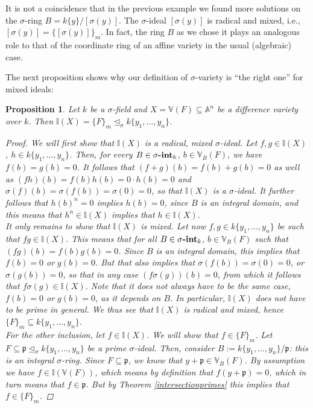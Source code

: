 \documentclass{article}
\def\I{\mathbb{I}}
\def\VV{\mathbb{V}}
\def\p{\mathfrak{p}}
\def\s{\sigma}
\def\si{\unlhd_{\sigma}}
\newcommand{\catname}[1]{{\normalfont\textbf{#1}}}
\newcommand{\sintk}{\s\text{\catname{-int}}_k}
\newenvironment{bew}{\begin{proof}[Proof]}{\end{proof}}
\theoremstyle{plain}
\newtheorem{prop}[Satz]{Proposition}
\theoremstyle{definition}
\begin{document}
It is not a coincidence that in the previous example we found more solutions on the $\s$-ring $B = k\{y\}/[\s(y)]$. The $\s$-ideal $[\s(y)]$ is radical and mixed, i.e., $[\s(y)] = \{ [\s(y)] \}_m$.
In fact, the ring $B$ as we chose it plays an analogous role to that of the coordinate ring of an affine variety in the usual (algebraic) case.

The next proposition shows why our definition of $\s$-variety is ``the right one'' for mixed ideals:

\begin{prop}\label{I=F_m}
Let $k$ be a $\s$-field and $X = \VV(F) \subseteq \mathbb{A}^n$ be a difference variety over $k$. Then $\I(X) = \{F\}_m \si k\{y_1,\ldots,y_n\}$. 
\begin{bew}
We will first show that $\I(X)$ is a radical, mixed $\s$-ideal.
Let $f, g \in \I(X)$, $h \in k\{y_1,\ldots,y_n\}$. Then, for every $B \in \sintk$, $b \in \VV_B(F)$, we have $f(b) = g(b) = 0$.
It follows that $(f + g)(b) = f(b) + g(b) = 0$ as well as $(fh)(b) = f(b)h(b) = 0 \cdot h(b) = 0$ and $\s(f)(b) = \s(f(b)) = \s(0) = 0$, so that $\I(X)$ is a $\s$-ideal.
It further follows that $h(b)^n = 0$ implies $h(b) = 0$, since $B$ is an integral domain, and this means that $h^n \in \I(X)$ implies that $ h \in \I(X)$. \\
\indent It only remains to show that $\I(X)$ is mixed. Let now $f,g \in k\{y_1,\ldots,y_n\}$ be such that $fg \in \I(X)$. This means that for all  $B \in \sintk$, $b \in \VV_B(F)$ such that
 $(fg)(b) = f(b) g(b) = 0$. Since $B$ is an integral domain,
this implies that $f(b) = 0$ or $g(b) = 0$. But that also implies that $\s(f(b)) = \s(0) = 0$, or $\s(g(b)) = 0$, so that in any case $(f\s(g))(b) = 0$, from which it follows that $f\s(g) \in \I(X)$.
Note that it does not always have to be the same case, $f(b) = 0$ or $g(b) = 0$, as it depends on $B$. In particular, $\I(X)$ does not have to be prime in general. We thus see that $\I(X)$ is radical and mixed, hence $\{F\}_m \subseteq k\{y_1,\ldots,y_n\}$. \\
\indent For the other inclusion, let $f \in \I(X)$. We will show that $f \in \{F\}_m$. Let $F \subseteq \p \si k\{y_1,\ldots,y_n\}$ be a prime $\s$-ideal.
Then, consider $B:= k\{y_1,\ldots,y_n\}/\p$: this is an integral $\s$-ring. Since $F \subseteq \p$, we know that $y + \p \in \VV_B(F)$. By assumption we have $f \in \I(\VV(F))$, which means by definition that $f(y + \p) = 0$, which
in turn means that $f \in \p$. But by Theorem \ref{intersectionprimes} this implies that $f \in \{F\}_m$.
\end{bew}
\end{prop}
\end{document}
